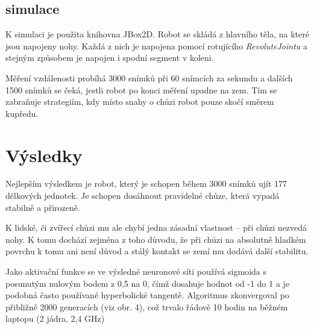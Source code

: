 \documentclass[a4]{article}
\begin{document}
\subsection{simulace}
K simulaci je použita knihovna JBox2D\cite{jbox2D}. Robot se skládá z hlavního těla, na které jsou napojeny nohy. Každá z nich je napojena pomocí rotujícího \emph{RevoluteJointu} a stejným způsobem je napojen i spodní segment v koleni.\par
Měření vzdálenosti probíhá 3000 snímků při 60 snímcích za sekundu a dalších 1500 snímků se čeká, jestli robot po konci měření upadne na zem. Tím se zabraňuje strategiím, kdy místo snahy o chůzi robot pouze skočí směrem kupředu.\par
\section{Výsledky}
Nejlepším výsledkem je robot, který je schopen během 3000 snímků ujít 177 délkových jednotek. Je schopen dosáhnout pravidelné chůze, která vypadá stabilně a přirozeně.\par 
K lidské, či zvířecí chůzi mu ale chybí jedna zásadní vlastnost -- při chůzi nezvedá nohy. K tomu dochází zejména z toho důvodu, že při chůzi na absolutně hladkém povrchu k tomu ani není důvod a stálý kontakt se zemí mu dodává další stabilitu.\par
Jako aktivační funkce se ve výsledné neuronové síti používá sigmoida s posunutým nulovým bodem z 0,5 na 0, čímž dosahuje hodnot od -1 do 1 a je podobná často používané hyperbolické tangentě.
Algoritmus zkonvergoval po přibližně 2000 generacích (viz obr. 4), což trvalo řádově 10 hodin na běžném laptopu (2 jádra, 2,4 GHz)
\end{document}

